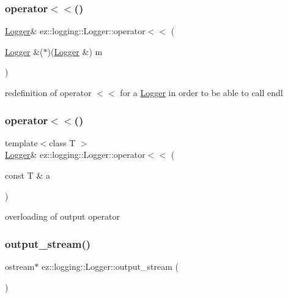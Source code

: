 \subsubsection{\texorpdfstring{operator$<$$<$()}{operator<<()}\hspace{0.1cm}{\footnotesize\ttfamily [1/2]}}
{\footnotesize\ttfamily \hyperlink{classez_1_1logging_1_1Logger}{Logger}\& ez\+::logging\+::\+Logger\+::operator$<$$<$ (\begin{DoxyParamCaption}\item[{\hyperlink{classez_1_1logging_1_1Logger}{Logger} \&($\ast$)(\hyperlink{classez_1_1logging_1_1Logger}{Logger} \&)}]{m }\end{DoxyParamCaption})\hspace{0.3cm}{\ttfamily [inline]}}

redefinition of operator $<$$<$ for a \hyperlink{classez_1_1logging_1_1Logger}{Logger} in order to be able to call endl \mbox{\label{classez_1_1logging_1_1Logger_a75006590ec6d4d6c8bca7d8824d887c2}} 
\subsubsection{\texorpdfstring{operator$<$$<$()}{operator<<()}\hspace{0.1cm}{\footnotesize\ttfamily [2/2]}}
{\footnotesize\ttfamily template$<$class T $>$ \\
\hyperlink{classez_1_1logging_1_1Logger}{Logger}\& ez\+::logging\+::\+Logger\+::operator$<$$<$ (\begin{DoxyParamCaption}\item[{const T \&}]{a }\end{DoxyParamCaption})\hspace{0.3cm}{\ttfamily [inline]}}

overloading of output operator \mbox{\label{classez_1_1logging_1_1Logger_a5d7092dd639907ccd702eb0df062821b}} 
\subsubsection{\texorpdfstring{output\+\_\+stream()}{output\_stream()}}
{\footnotesize\ttfamily ostream$\ast$ ez\+::logging\+::\+Logger\+::output\+\_\+stream (\begin{DoxyParamCaption}{ }\end{DoxyParamCaption})\hspace{0.3cm}{\ttfamily [inline]}}

